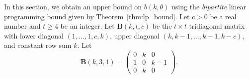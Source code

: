 In this section, we obtain an upper bound on $b(k,\theta)$ using the {\em bipartite} linear programming bound given by Theorem~\ref{thm:lp_bound}. Let $c>0$ be a real number and $t\geq 4$ be an integer. Let $\boldsymbol{B}(k,t,c)$ be the $t \times t$ tridiagonal 
matrix 
with lower diagonal $(1,\ldots,1,c,k)$, upper diagonal $(k,k-1,\ldots, k-1,k-c)$, and constant row sum $k$. 
Let
\[
\boldsymbol{B}(k,3,1)=\begin{pmatrix}
0&k&0 \\
1&0&k-1 \\
0&k& 0
\end{pmatrix}.
\]


